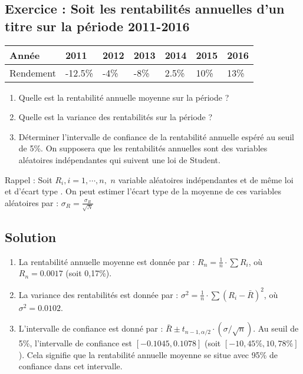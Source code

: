 \documentclass[a4paper, 12pt]{report}
\begin{document}
\subsection{Exercice : Soit les rentabilités annuelles d'un titre sur la période 2011-2016}

\begin{center}
	\begin{tabular}{@{}lllllll@{}}
	\toprule
	Année     & 2011    & 2012 & 2013 & 2014  & 2015 & 2016 \\ \midrule
	Rendement & -12.5\% & -4\% & -8\% & 2.5\% & 10\% & 13\% \\ \bottomrule
\end{tabular}
\end{center}


\begin{enumerate}
	\item Quelle est la rentabilité annuelle moyenne sur la période ?
	\item Quelle est la variance des rentabilités sur la période ?
	\item Déterminer l’intervalle de confiance de la rentabilité annuelle espéré au seuil de 5\%. On supposera que les rentabilités annuelles sont des variables aléatoires indépendantes  qui suivent une loi de Student.
\end{enumerate}

Rappel : Soit \(  R_i, i =1,\cdots,n, \) \( n \) variable aléatoires indépendantes et de même loi et d'écart type  . On peut estimer l'écart type de la moyenne de ces variables aléatoires par : \( \sigma_R = \frac{\sigma_R }{\sqrt{N}} \)

\subsection{Solution}

\begin{enumerate}
	\item La rentabilité annuelle moyenne est donnée par : $R_n = \frac{1}{n} \cdot \sum R_i$, où $R_n = 0.0017$ (soit 0,17\%).
	\item La variance des rentabilités est donnée par : $\sigma^2 = \frac{1}{n} \cdot \sum (R_i - \bar{R})^2$, où $\sigma^2 = 0.0102$.
	\item L'intervalle de confiance est donné par : $\bar{R} \pm t_{n-1,\alpha/2} \cdot (\sigma / \sqrt{n})$. Au seuil de 5\%, l'intervalle de confiance est $[-0.1045, 0.1078]$ (soit $[-10,45\%, 10,78\%]$). Cela signifie que la rentabilité annuelle moyenne se situe avec 95\% de confiance dans cet intervalle.
\end{enumerate}
\end{document}
